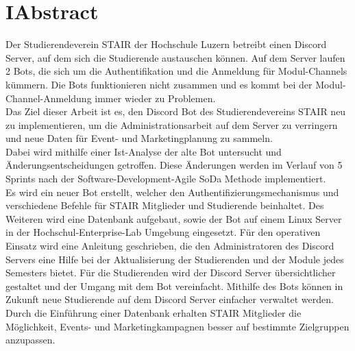 \documentclass[a4paper, table]{article}
\begin{document}
\section*{I{\hspace*{1cm}}Abstract}
Der Studierendeverein \gls{STAIR} der Hochschule Luzern betreibt einen Discord Server, auf dem sich die Studierende austauschen können. 
Auf dem Server laufen 2 Bots, die sich um die Authentifikation und die Anmeldung für Modul-Channels kümmern. 
Die Bots funktionieren nicht zusammen und es kommt bei der Modul-Channel-Anmeldung immer wieder zu Problemen.\\
Das Ziel dieser Arbeit ist es, den Discord Bot des Studierendevereins STAIR neu zu implementieren, um die Administrationsarbeit auf dem Server zu verringern und neue Daten für Event- und Marketingplanung zu sammeln.\\
Dabei wird mithilfe einer Ist-Analyse der alte Bot untersucht und Änderungsentscheidungen getroffen. 
Diese Änderungen werden im Verlauf von 5 Sprints nach der Software-Development-Agile \gls{SoDa} Methode implementiert.\\
Es wird ein neuer Bot erstellt, welcher den Authentifizierungsmechanismus und verschiedene Befehle für STAIR Mitglieder und Studierende beinhaltet. 
Des Weiteren wird eine Datenbank aufgebaut, sowie der Bot auf einem Linux Server in der Hochschul-Enterprise-Lab Umgebung eingesetzt. 
Für den operativen Einsatz wird eine Anleitung geschrieben, die den Administratoren des Discord Servers eine Hilfe bei der Aktualisierung der Studierenden und der Module jedes Semesters bietet. 
Für die Studierenden wird der Discord Server übersichtlicher gestaltet und der Umgang mit dem Bot vereinfacht. 
Mithilfe des Bots können in Zukunft neue Studierende auf dem Discord Server einfacher verwaltet werden. 
Durch die Einführung einer Datenbank erhalten STAIR Mitglieder die Möglichkeit, Events- und Marketingkampagnen besser auf bestimmte Zielgruppen anzupassen.\\\\
\end{document}
